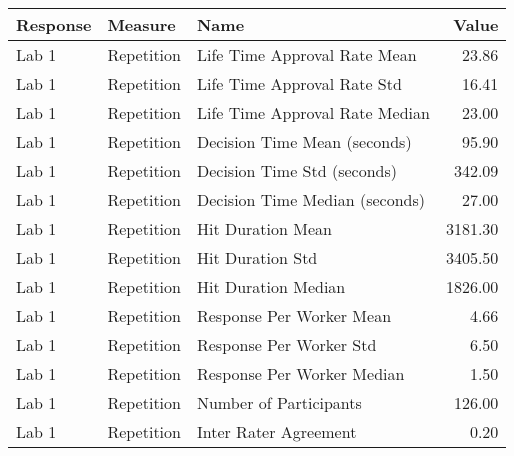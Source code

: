 \begin{tabular}{lllr}
\toprule
Response & Measure & Name & Value \\
\midrule
Lab 1 & Repetition & Life Time Approval Rate Mean & 23.86 \\
Lab 1 & Repetition & Life Time Approval Rate Std & 16.41 \\
Lab 1 & Repetition & Life Time Approval Rate Median & 23.00 \\
Lab 1 & Repetition & Decision Time Mean (seconds) & 95.90 \\
Lab 1 & Repetition & Decision Time Std (seconds) & 342.09 \\
Lab 1 & Repetition & Decision Time Median (seconds) & 27.00 \\
Lab 1 & Repetition & Hit Duration Mean & 3181.30 \\
Lab 1 & Repetition & Hit Duration Std & 3405.50 \\
Lab 1 & Repetition & Hit Duration Median & 1826.00 \\
Lab 1 & Repetition & Response Per Worker Mean & 4.66 \\
Lab 1 & Repetition & Response Per Worker Std & 6.50 \\
Lab 1 & Repetition & Response Per Worker Median & 1.50 \\
Lab 1 & Repetition & Number of Participants & 126.00 \\
Lab 1 & Repetition & Inter Rater Agreement & 0.20 \\
\bottomrule
\end{tabular}
